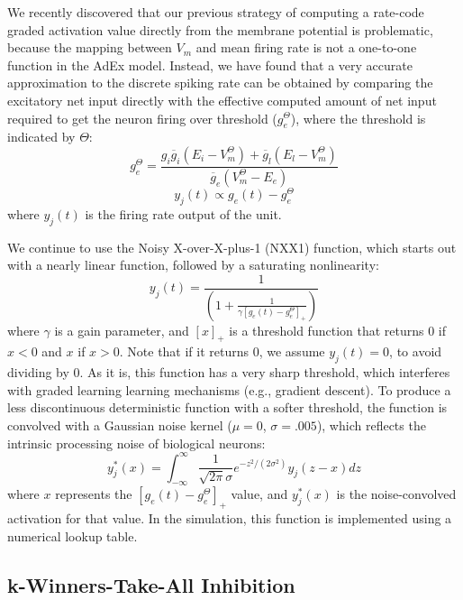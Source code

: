 \documentclass[10pt,letterpaper]{article}
\newcommand{\oneo}[1]{\frac{1}{#1}}
\numberwithin{equation}{section}
\begin{document}
We recently discovered that our previous strategy of computing a rate-code
graded activation value directly from the membrane potential is problematic,
because the mapping between $V_m$ and mean firing rate is not a one-to-one
function in the AdEx model. Instead, we have found that a very accurate
approximation to the discrete spiking rate can be obtained by comparing the
excitatory net input directly with the effective computed amount of net input
required to get the neuron firing over threshold ($g_e^{\Theta}$), where the
threshold is indicated by $\Theta$:
\begin{equation}
g_e^{\Theta} = \frac{g_i \overline{g}_i (E_i - V_m^{\Theta}) +
 \overline{g}_l(E_l - V_m^{\Theta})} {\overline{g}_e (V_m^{\Theta} - E_e)}
\end{equation}
\begin{equation}
 y_j(t) \propto g_e(t) - g_e^{\Theta}
\end{equation}
where $y_j(t)$ is the firing rate output of the unit.

We continue to use the Noisy X-over-X-plus-1 (NXX1) function, which starts out
with a nearly linear function, followed by a saturating nonlinearity:
\begin{equation}
 y_j(t) = \oneo{\left(1 + \oneo{\gamma [g_e(t) - g_e^{\Theta}]_+} \right)}
\end{equation}
where $\gamma$ is a gain parameter, and $[x]_+$ is a threshold function that
returns 0 if $x<0$ and $x$ if $x>0$. Note that if it returns 0, we assume
$y_j(t) = 0$, to avoid dividing by 0. As it is, this function has a very
sharp threshold, which interferes with graded learning learning mechanisms
(e.g., gradient descent). To produce a less discontinuous deterministic
function with a softer threshold, the function is convolved with a Gaussian
noise kernel ($\mu=0$, $\sigma=.005$), which reflects the intrinsic processing
noise of biological neurons:
\begin{equation}
 y^*_j(x) = \int_{-\infty}^{\infty} \oneo{\sqrt{2 \pi} \sigma}
 e^{-z^2/(2 \sigma^2)} y_j(z-x) dz
 \label{eq.conv}
\end{equation}
where $x$ represents the $[g_e(t) - g_e^{\Theta}]_+$ value, and $y^*_j(x)$
is the noise-convolved activation for that value. In the simulation,
this function is implemented using a numerical lookup table.

\subsection{k-Winners-Take-All Inhibition}
\end{document}
